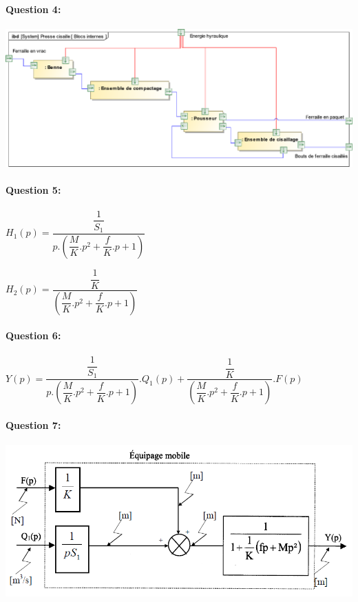 \paragraph{Question 4:}

\begin{center}
 \includegraphics[width=0.8\linewidth]{img/Blocs_internes_corrige}
\end{center}

\paragraph{Question 5:}

$H_1(p)=\dfrac{\dfrac{1}{S_1}}{p.\left(\dfrac{M}{K}.p^2+\dfrac{f}{K}.p+1\right)}$

$H_2(p)=\dfrac{\dfrac{1}{K}}{\left(\dfrac{M}{K}.p^2+\dfrac{f}{K}.p+1\right)}$

\paragraph{Question 6:}

$Y(p)=\dfrac{\dfrac{1}{S_1}}{p.\left(\dfrac{M}{K}.p^2+\dfrac{f}{K}.p+1\right)}.Q_1(p)+\dfrac{\dfrac{1}{K}}{\left(\dfrac{M}{K}.p^2+\dfrac{f}{K}.p+1\right)}.F(p)$

\paragraph{Question 7:}

\begin{center}
 \includegraphics[width=0.8\linewidth]{img/SB1_corrige}
\end{center}

